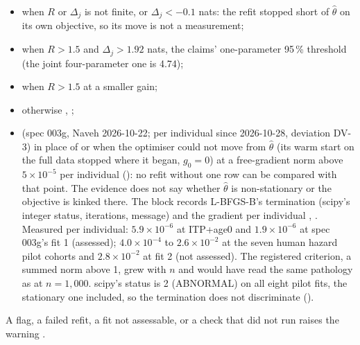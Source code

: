 \begin{itemize}[nosep]
  \item {} when $R$ or $\Delta_j$ is not finite, or $\Delta_j<-0.1$ nats: the refit stopped short of
    $\hat\theta$ on its own objective, so its move is not a measurement;
  \item {} when $R>1.5$ and $\Delta_j>1.92$ nats, the claims' one-parameter 95\,\% threshold (the joint
    four-parameter one is 4.74);
  \item {} when $R>1.5$ at a smaller gain;
  \item {} otherwise , ;
  \item {} (spec 003g, Naveh 2026-10-22; per individual since 2026-10-28, deviation DV-3) in place of
     or  when the optimiser could not move from $\hat\theta$ (its warm start on the
    full data stopped where it began, $g_0=0$) at a free-gradient norm above $5\times10^{-5}$ per individual
    (): no refit without one row can be compared with that point. The evidence
    does not say whether $\hat\theta$ is non-stationary or the objective is kinked there. The block records L-BFGS-B's
    termination (scipy's integer status, iterations, message) and the gradient per individual
    , . Measured per individual: $5.9\times10^{-6}$ at
    ITP+age0 and $1.9\times10^{-6}$ at spec 003g's fit 1 (assessed); $4.0\times10^{-4}$ to $2.6\times10^{-2}$ at the seven
    human hazard pilot cohorts and $2.8\times10^{-2}$ at fit 2 (not assessed). The registered criterion, a summed norm
    above 1, grew with $n$ and would have read the same pathology as  at $n=1{,}000$. scipy's status is 2
    (ABNORMAL) on all eight pilot fits, the stationary one included, so the termination does not discriminate
    ().
\end{itemize}
A flag, a failed refit, a fit not assessable, or a check that did not run raises the warning 
.


